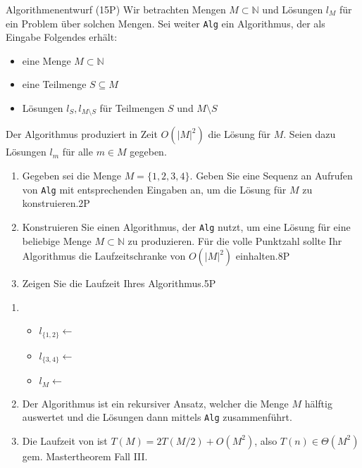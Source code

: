 \documentclass{article}
\begin{document}
\begin{exercise}{Algorithmenentwurf (15P)}
  Wir betrachten Mengen $M \subset \mathbb{N}$ und Lösungen $l_M$ für ein Problem über solchen Mengen. Sei weiter \texttt{Alg} ein Algorithmus, der als Eingabe Folgendes erhält:
  \begin{itemize}
    \item eine Menge $M \subset \mathbb{N}$
    \item eine Teilmenge $S \subseteq M$
    \item Lösungen $l_S, l_{M \setminus S}$ für Teilmengen $S$ und $M \setminus S$
  \end{itemize}
  Der Algorithmus produziert in Zeit $O(|M|^2)$ die Lösung für $M$. Seien dazu Lösungen $l_m$ für alle $m \in M$ gegeben.
  \begin{enumerate}
    \item Gegeben sei die Menge $M = \{1, 2, 3, 4\}$. Geben Sie eine Sequenz an Aufrufen von \texttt{Alg} mit entsprechenden Eingaben an, um die Lösung für $M$ zu konstruieren.\hfill 2P
    \item Konstruieren Sie einen Algorithmus, der \texttt{Alg} nutzt, um eine Lösung für eine beliebige Menge $M \subset \mathbb{N}$ zu produzieren. Für die volle Punktzahl sollte Ihr Algorithmus die Laufzeitschranke von $O(|M|^2)$ einhalten.\hfill 8P
    \item Zeigen Sie die Laufzeit Ihres Algorithmus.\hfill 5P
  \end{enumerate}
  \begin{solution}
    \begin{enumerate}
      \item \begin{itemize}
              \item $l_{\{1,2\}}\gets$
              \item $l_{\{3,4\}}\gets$
              \item $l_{M}\gets$
            \end{itemize}
      \item Der Algorithmus  ist ein rekursiver Ansatz, welcher die Menge $M$ hälftig auswertet und die Lösungen dann mittels \texttt{Alg} zusammenführt.\par
            
      \item Die Laufzeit von  ist $T(M)=2T(M/2)+O(M^2)$, also $T(n) \in \Theta(M^2)$ gem. Mastertheorem Fall III.
    \end{enumerate}
  \end{solution}
\end{exercise}
\end{document}
